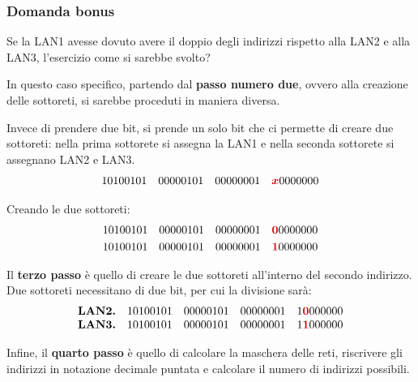 \documentclass[a4paper]{article}
\newcommand{\binaryaddress}[4]{#1 \hspace{1em} #2 \hspace{1em} #3 \hspace{1em} #4}
\begin{document}
	\newpage
	
	\subsubsection{\textcolor{Red3}{Domanda bonus}}
	
	Se la LAN1 avesse dovuto avere il doppio degli indirizzi rispetto alla LAN2 e alla LAN3, l'esercizio come si sarebbe svolto?\newline
	
	\noindent
	In questo caso specifico, partendo dal \textbf{passo numero due}, ovvero alla creazione delle sottoreti, si sarebbe proceduti in maniera diversa.\newline
	
	\noindent
	Invece di prendere due bit, si prende un solo bit che ci permette di creare due sottoreti: nella prima sottorete si assegna la LAN1 e nella seconda sottorete si assegnano LAN2 e LAN3.
	\begin{equation*}
		\binaryaddress{10100101}{00000101}{00000001}{\textcolor{Red3}{\boldsymbol{x}}0000000}
	\end{equation*}
	
	\noindent
	Creando le due sottoreti:
	\begin{gather*}
		\binaryaddress{10100101}{00000101}{00000001}{\textcolor{Red3}{\boldsymbol{0}}0000000} \\
		\binaryaddress{10100101}{00000101}{00000001}{\textcolor{Red3}{\boldsymbol{1}}0000000}
	\end{gather*}
	
	\noindent
	Il \textbf{terzo passo} è quello di creare le due sottoreti all’interno del secondo indirizzo. Due sottoreti necessitano di due bit, per cui la divisione sarà:
	\begin{equation*}
		\begin{array}{ll}
			\textbf{LAN2.} & \binaryaddress{10100101}{00000101}{00000001}{1\textcolor{Red3}{\boldsymbol{0}}000000} \\
			\textbf{LAN3.} & \binaryaddress{10100101}{00000101}{00000001}{1\textcolor{Red3}{\boldsymbol{1}}000000}
		\end{array}
	\end{equation*}

	\noindent
	Infine, il \textbf{quarto passo} è quello di calcolare la maschera delle reti, riscrivere gli indirizzi in notazione decimale puntata e calcolare il numero di indirizzi possibili.\newline
	
\end{document}
